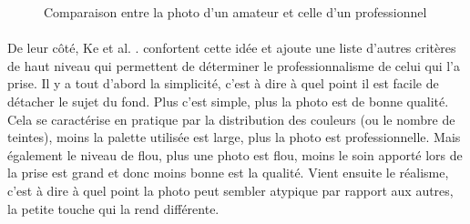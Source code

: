 \documentclass[11pt, french]{report-rd-info}
\begin{document}
\begin{figure}[htp]
  \caption{Comparaison entre la photo d'un amateur et celle d'un professionnel\cite{Ke}}
  \label{fig:ComparaisonPhotosAmateurPro}
\end{figure}




\paragraph*{}
De leur côté, Ke et al. . \cite{Ke}  confortent cette idée et ajoute une liste d’autres critères de haut niveau qui permettent de déterminer le professionnalisme de celui qui l’a prise. Il y a tout d’abord la simplicité, c'est à dire à quel point il est facile de détacher le sujet du fond. Plus c'est simple, plus la photo est de bonne qualité. Cela se caractérise en pratique par la distribution des couleurs (ou le nombre de teintes), moins la palette utilisée est large, plus la photo est professionnelle. Mais également le niveau de flou, plus une photo est flou, moins le soin apporté lors de la prise est grand et donc moins bonne est la qualité.
Vient ensuite le réalisme, c'est à dire à quel point la photo peut sembler atypique par rapport aux autres, la petite touche qui la rend différente.
\end{document}
